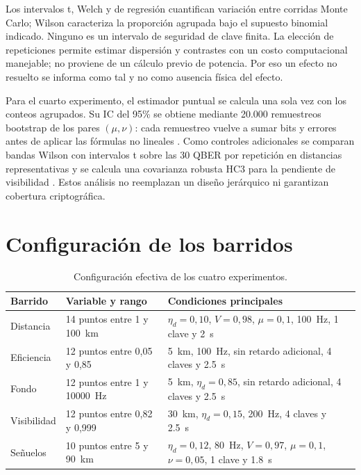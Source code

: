 Los intervalos t, Welch y de regresión cuantifican variación entre corridas Monte Carlo; Wilson caracteriza la proporción agrupada bajo el supuesto binomial indicado. Ninguno es un intervalo de seguridad de clave finita. La elección de \PThreeRepetitions{} repeticiones permite estimar dispersión y contrastes con un costo computacional manejable; no proviene de un cálculo previo de potencia. Por eso un efecto no resuelto se informa como tal y no como ausencia física del efecto.

Para el cuarto experimento, el estimador puntual se calcula una sola vez con los conteos agrupados. Su IC del 95\% se obtiene mediante 20.000 remuestreos bootstrap de los pares \((\mu,\nu)\): cada remuestreo vuelve a sumar bits y errores antes de aplicar las fórmulas no lineales \cite{efron1979bootstrap}. Como controles adicionales se comparan bandas Wilson con intervalos t sobre las 30 QBER por repetición en distancias representativas y se calcula una covarianza robusta HC3 para la pendiente de visibilidad \cite{mackinnonWhite1985}. Estos análisis no reemplazan un diseño jerárquico ni garantizan cobertura criptográfica.

\section{Configuración de los barridos}

\begin{table}[htbp]
  \centering
  \small
  \begin{tabularx}{\textwidth}{p{}p{}X}
    \toprule
    Barrido & Variable y rango & Condiciones principales \\
    \midrule
    Distancia & 14 puntos entre 1 y \SI{100}{\kilo\meter} & \(\eta_d=0{,}10\), \(V=0{,}98\), \(\mu=0{,}1\), \SI{100}{\hertz}, 1 clave y \SI{2}{\second} \\
    Eficiencia & 12 puntos entre 0,05 y 0,85 & \SI{5}{\kilo\meter}, \SI{100}{\hertz}, sin retardo adicional, 4 claves y \SI{2.5}{\second} \\
    Fondo & 12 puntos entre 1 y \SI{10000}{\hertz} & \SI{5}{\kilo\meter}, \(\eta_d=0{,}85\), sin retardo adicional, 4 claves y \SI{2.5}{\second} \\
    Visibilidad & 12 puntos entre 0,82 y 0,999 & \SI{30}{\kilo\meter}, \(\eta_d=0{,}15\), \SI{200}{\hertz}, 4 claves y \SI{2.5}{\second} \\
    Señuelos & 10 puntos entre 5 y \SI{90}{\kilo\meter} & \(\eta_d=0{,}12\), \SI{80}{\hertz}, \(V=0{,}97\), \(\mu=0{,}1\), \(\nu=0{,}05\), 1 clave y \SI{1.8}{\second} \\
    \bottomrule
  \end{tabularx}
  \caption{Configuración efectiva de los cuatro experimentos.}
  \label{tab:resumen_barridos}
\end{table}

